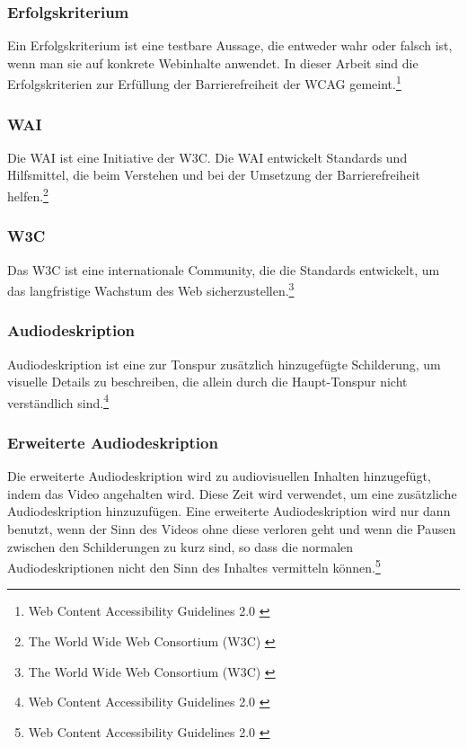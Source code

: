 \subsubsection{Erfolgskriterium}
Ein Erfolgskriterium ist eine testbare Aussage, die entweder wahr oder falsch ist, wenn man sie auf konkrete Webinhalte anwendet. In dieser
Arbeit sind die Erfolgskriterien zur Erfüllung der Barrierefreiheit der \ac{WCAG} gemeint.\footnote{Web Content Accessibility Guidelines 2.0 \cite{WCAG2.0}}

\subsubsection{\ac{WAI}}
Die \ac{WAI} ist eine Initiative der \ac{W3C}. Die \ac{WAI} entwickelt Standards und Hilfsmittel, die beim Verstehen und bei der Umsetzung 
der Barrierefreiheit helfen.\footnote{The World Wide Web Consortium (W3C) \cite{w3c}}

\subsubsection{\ac{W3C}}
Das \ac{W3C} ist eine internationale Community, die die Standards entwickelt, um das langfristige Wachstum des Web 
sicherzustellen.\footnote{The World Wide Web Consortium (W3C) \cite{w3c}}

\subsubsection{Audiodeskription}
Audiodeskription ist eine zur Tonspur zusätzlich hinzugefügte Schilderung, um visuelle Details zu beschreiben, die allein durch die Haupt-Tonspur 
nicht verständlich sind.\footnote{Web Content Accessibility Guidelines 2.0 \cite{WCAG2.0}}

\subsubsection{Erweiterte Audiodeskription}
Die erweiterte Audiodeskription wird zu audiovisuellen Inhalten hinzugefügt, indem das Video angehalten wird. Diese Zeit wird verwendet, 
um eine zusätzliche Audiodeskription hinzuzufügen. Eine erweiterte Audiodeskription wird nur dann benutzt, wenn der Sinn des Videos ohne diese verloren geht und wenn 
die Pausen zwischen den Schilderungen zu kurz sind, so dass die normalen Audiodeskriptionen nicht den Sinn des Inhaltes vermitteln 
können.\footnote{Web Content Accessibility Guidelines 2.0 \cite{WCAG2.0}}

